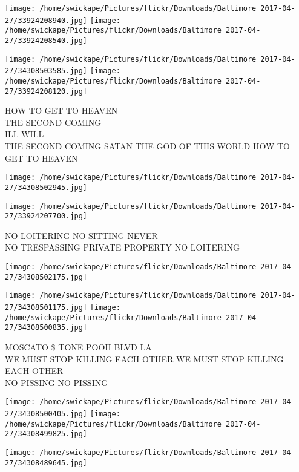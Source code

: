 \documentclass[10pt,letterpaper]{article}
\begin{document}
\texttt{[image: /home/swickape/Pictures/flickr/Downloads/Baltimore 2017-04-27/33924208940.jpg]}
\texttt{[image: /home/swickape/Pictures/flickr/Downloads/Baltimore 2017-04-27/33924208540.jpg]}

\texttt{[image: /home/swickape/Pictures/flickr/Downloads/Baltimore 2017-04-27/34308503585.jpg]}
\texttt{[image: /home/swickape/Pictures/flickr/Downloads/Baltimore 2017-04-27/33924208120.jpg]}

HOW TO GET TO HEAVEN\\
THE SECOND COMING\\
ILL WILL\\
THE SECOND COMING SATAN THE GOD OF THIS WORLD HOW TO GET TO HEAVEN\\
\pagebreak

\texttt{[image: /home/swickape/Pictures/flickr/Downloads/Baltimore 2017-04-27/34308502945.jpg]}

\vspace{0.25in}
\texttt{[image: /home/swickape/Pictures/flickr/Downloads/Baltimore 2017-04-27/33924207700.jpg]}

NO LOITERING NO SITTING NEVER\\
NO TRESPASSING PRIVATE PROPERTY NO LOITERING\\
\pagebreak

\texttt{[image: /home/swickape/Pictures/flickr/Downloads/Baltimore 2017-04-27/34308502175.jpg]}

\vspace{0.25in}
\texttt{[image: /home/swickape/Pictures/flickr/Downloads/Baltimore 2017-04-27/34308501175.jpg]}
\texttt{[image: /home/swickape/Pictures/flickr/Downloads/Baltimore 2017-04-27/34308500835.jpg]}

MOSCATO \$ TONE POOH BLVD LA\\
WE MUST STOP KILLING EACH OTHER WE MUST STOP KILLING EACH OTHER\\
NO PISSING NO PISSING\\
\pagebreak

\texttt{[image: /home/swickape/Pictures/flickr/Downloads/Baltimore 2017-04-27/34308500405.jpg]}
\texttt{[image: /home/swickape/Pictures/flickr/Downloads/Baltimore 2017-04-27/34308499825.jpg]}

\texttt{[image: /home/swickape/Pictures/flickr/Downloads/Baltimore 2017-04-27/34308489645.jpg]}
\end{document}
